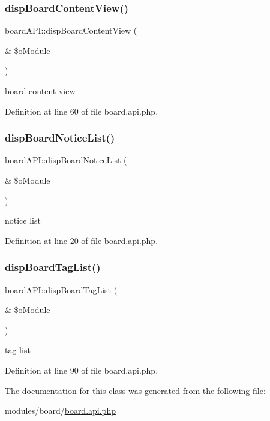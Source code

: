 \subsubsection{\texorpdfstring{disp\+Board\+Content\+View()}{dispBoardContentView()}}
{\footnotesize\ttfamily board\+A\+P\+I\+::disp\+Board\+Content\+View (\begin{DoxyParamCaption}\item[{\&}]{\$o\+Module }\end{DoxyParamCaption})}



board content view 



Definition at line 60 of file board.\+api.\+php.

\mbox{\label{classboardAPI_a18395a2be76383d74317c1fcc1fb5830}} 
\subsubsection{\texorpdfstring{disp\+Board\+Notice\+List()}{dispBoardNoticeList()}}
{\footnotesize\ttfamily board\+A\+P\+I\+::disp\+Board\+Notice\+List (\begin{DoxyParamCaption}\item[{\&}]{\$o\+Module }\end{DoxyParamCaption})}



notice list 



Definition at line 20 of file board.\+api.\+php.

\mbox{\label{classboardAPI_af31d812495ea03d7a81c836463a56cad}} 
\subsubsection{\texorpdfstring{disp\+Board\+Tag\+List()}{dispBoardTagList()}}
{\footnotesize\ttfamily board\+A\+P\+I\+::disp\+Board\+Tag\+List (\begin{DoxyParamCaption}\item[{\&}]{\$o\+Module }\end{DoxyParamCaption})}



tag list 



Definition at line 90 of file board.\+api.\+php.



The documentation for this class was generated from the following file\+:\begin{DoxyCompactItemize}
\item 
modules/board/\hyperlink{board_8api_8php}{board.\+api.\+php}\end{DoxyCompactItemize}
